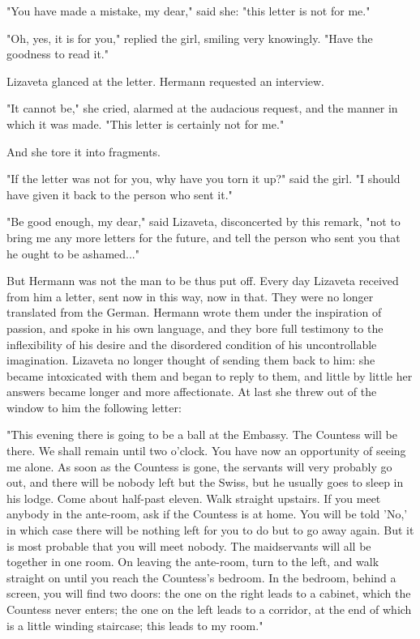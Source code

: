 "You have made a mistake, my dear," said she: "this letter is not for
me."

"Oh, yes, it is for you," replied the girl, smiling very knowingly.
"Have the goodness to read it."

Lizaveta glanced at the letter. Hermann requested an interview.

"It cannot be," she cried, alarmed at the audacious request, and the
manner in which it was made. "This letter is certainly not for me."

And she tore it into fragments.

"If the letter was not for you, why have you torn it up?" said the
girl. "I should have given it back to the person who sent it."

"Be good enough, my dear," said Lizaveta, disconcerted by this remark,
"not to bring me any more letters for the future, and tell the person
who sent you that he ought to be ashamed..."

But Hermann was not the man to be thus put off. Every day Lizaveta
received from him a letter, sent now in this way, now in that. They
were no longer translated from the German. Hermann wrote them under
the inspiration of passion, and spoke in his own language, and they
bore full testimony to the inflexibility of his desire and the
disordered condition of his uncontrollable imagination. Lizaveta no
longer thought of sending them back to him: she became intoxicated
with them and began to reply to them, and little by little her answers
became longer and more affectionate. At last she threw out of the
window to him the following letter:

"This evening there is going to be a ball at the Embassy. The Countess
will be there. We shall remain until two o'clock. You have now an
opportunity of seeing me alone. As soon as the Countess is gone, the
servants will very probably go out, and there will be nobody left but
the Swiss, but he usually goes to sleep in his lodge. Come about
half-past eleven. Walk straight upstairs. If you meet anybody in the
ante-room, ask if the Countess is at home. You will be told 'No,' in
which case there will be nothing left for you to do but to go away
again. But it is most probable that you will meet nobody. The
maidservants will all be together in one room. On leaving the
ante-room, turn to the left, and walk straight on until you reach the
Countess's bedroom. In the bedroom, behind a screen, you will find two
doors: the one on the right leads to a cabinet, which the Countess
never enters; the one on the left leads to a corridor, at the end of
which is a little winding staircase; this leads to my room."

